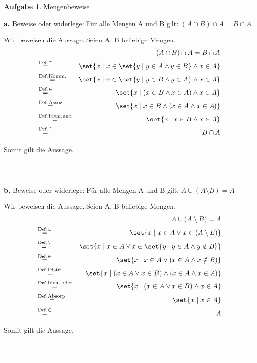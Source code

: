\documentclass[10pt,leqno ]{article}
\DeclarePairedDelimiter\set\{\}
\newcommand\customeq[1]{\overset{\mathrm{#1}}{=}}
\theoremstyle{definition}
\newtheorem{problem}[theorem]{Aufgabe}
\newenvironment{solution}[1][L]{\begin{doublespace}\textbf{#1.}\quad }{\ \rule{0.5em}{0.5em}\end{doublespace}}
\begin{document}
\begin{problem}
Mengenbeweise
\end{problem}

\begin{solution}[a]
Beweise oder widerlege: Für alle Mengen A und B gilt: \( (A \cap B) \cap A = B \cap A \)

Wir beweisen die Aussage. Seien A, B beliebige Mengen.
\begin{align*}
    & & (A \cap B) \cap A = B \cap A \\
    & \customeq{Def. \cap} & \set{x \mid x \in \set{y \mid y \in A \land y \in B} \land x \in A} \\
    & \customeq{Def. Komm.} & \set{x \mid x \in \set{y \mid y \in B \land y \in A} \land x \in A} \\
    & \customeq{Def. \in} & \set{x \mid (x \in B \land x \in A) \land x \in A} \\
    & \customeq{Def. Assoz} & \set{x \mid x \in B \land (x \in A \land x \in A)} \\
    & \customeq{Def. Idem. und} & \set{x \mid x \in B \land x \in A} \\
    & \customeq{Def. \cap} & B \cap A \\
\end{align*}

Somit gilt die Aussage.

\end{solution}

\begin{solution}[b]
Beweise oder widerlege: Für alle Mengen A und B gilt: \( A \cup (A \setminus B ) = A  \)

Wir beweisen die Aussage. Seien A, B beliebige Mengen.
\begin{align*}
    & & A \cup (A \setminus B ) = A \\
    & \customeq{Def. \cup} & \set{x \mid x \in A \lor x \in (A \setminus B)} \\
    & \customeq{Def. \setminus} & \set{x \mid x \in A \lor x \in \set{y \mid y \in A \land y \notin B}} \\
    & \customeq{Def. \in} & \set{x \mid x \in A \lor (x \in A \land x \notin B)} \\
    & \customeq{Def. Distri.} & \set{x \mid (x \in A \lor x \in B) \land (x \in A \land x \in A)} \\
    & \customeq{Def. Idem. oder} & \set{x \mid (x \in A \lor x \in B) \land x \in A} \\
    & \customeq{Def. Absorp.} & \set{x \mid x \in A} \\
    & \customeq{Def. \in} & A \\
\end{align*}

Somit gilt die Aussage.

\end{solution}
\end{document}
